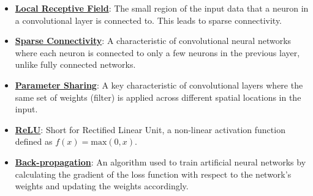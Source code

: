 \documentclass{article}%
\begin{document}
\begin{itemize}[leftmargin=*]
\item \href{https://purdue.brightspace.com/d2l/common/assets/pdfjs-d2l-dist/1.0.14-legacy/web/viewer.html?file=\%2Fcontent\%2Fenforced\%2F1095467-wl.202510.CS.24300.001\%2F09L1-cnn.pdf\%3Fou\%3D1095467\&lang=en-us\&container=d2l-fileviewer-rendered-pdf\&fullscreen=d2l-fileviewer-rendered-pdf-dialog\&height=667#page=10}{\textbf{Local Receptive Field}}: The small region of the input data that a neuron in a convolutional layer is connected to. This leads to sparse connectivity.%
\item \href{https://purdue.brightspace.com/d2l/common/assets/pdfjs-d2l-dist/1.0.14-legacy/web/viewer.html?file=\%2Fcontent\%2Fenforced\%2F1095467-wl.202510.CS.24300.001\%2F09L1-cnn.pdf\%3Fou\%3D1095467\&lang=en-us\&container=d2l-fileviewer-rendered-pdf\&fullscreen=d2l-fileviewer-rendered-pdf-dialog\&height=667#page=10}{\textbf{Sparse Connectivity}}: A characteristic of convolutional neural networks where each neuron is connected to only a few neurons in the previous layer, unlike fully connected networks.%
\item \href{https://purdue.brightspace.com/d2l/common/assets/pdfjs-d2l-dist/1.0.14-legacy/web/viewer.html?file=\%2Fcontent\%2Fenforced\%2F1095467-wl.202510.CS.24300.001\%2F09L1-cnn.pdf\%3Fou\%3D1095467\&lang=en-us\&container=d2l-fileviewer-rendered-pdf\&fullscreen=d2l-fileviewer-rendered-pdf-dialog\&height=667#page=12}{\textbf{Parameter Sharing}}: A key characteristic of convolutional layers where the same set of weights (filter) is applied across different spatial locations in the input.%
\item \href{https://purdue.brightspace.com/d2l/common/assets/pdfjs-d2l-dist/1.0.14-legacy/web/viewer.html?file=\%2Fcontent\%2Fenforced\%2F1095467-wl.202510.CS.24300.001\%2F09L1-cnn.pdf\%3Fou\%3D1095467\&lang=en-us\&container=d2l-fileviewer-rendered-pdf\&fullscreen=d2l-fileviewer-rendered-pdf-dialog\&height=667#page=13}{\textbf{ReLU}}: Short for Rectified Linear Unit, a non-linear activation function defined as $f(x) = \text{max}(0, x)$.%
\item \href{https://purdue.brightspace.com/d2l/common/assets/pdfjs-d2l-dist/1.0.14-legacy/web/viewer.html?file=\%2Fcontent\%2Fenforced\%2F1095467-wl.202510.CS.24300.001\%2F09L1-cnn.pdf\%3Fou\%3D1095467\&lang=en-us\&container=d2l-fileviewer-rendered-pdf\&fullscreen=d2l-fileviewer-rendered-pdf-dialog\&height=667#page=16}{\textbf{Back{-}propagation}}: An algorithm used to train artificial neural networks by calculating the gradient of the loss function with respect to the network's weights and updating the weights accordingly.%

\end{itemize}
\end{document}
